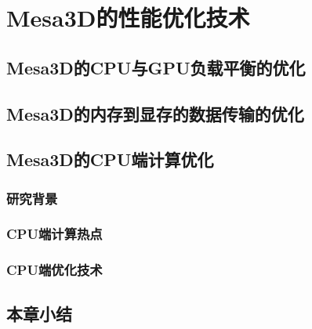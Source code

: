
\chapter{Mesa3D的性能优化技术}

\section{Mesa3D的CPU与GPU负载平衡的优化}


\newpage
\section{Mesa3D的内存到显存的数据传输的优化}


\section{Mesa3D的CPU端计算优化}

\subsection{研究背景}

\subsection{CPU端计算热点}

\subsection{CPU端优化技术}

\section{本章小结}
